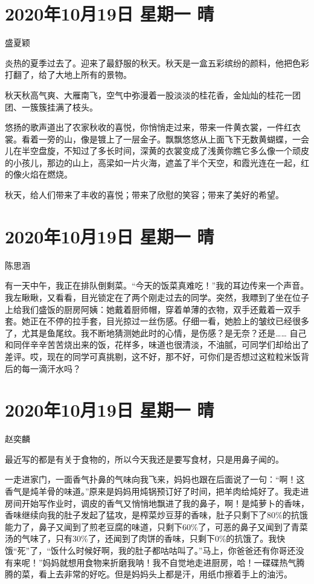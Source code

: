 \section{2020年10月19日 星期一 晴}

盛夏颖

炎热的夏季过去了。迎来了最舒服的秋天。秋天是一盒五彩缤纷的颜料，他把色彩打翻了，给了大地上所有的景物。

秋天秋高气爽、大雁南飞，空气中弥漫着一股淡淡的桂花香，金灿灿的桂花一团团、一簇簇挂满了枝头。

悠扬的歌声道出了农家秋收的喜悦，你悄悄走过来，带来一件黄衣裳，一件红衣裳。看着一旁的山，像是镀上了一层金子。飘飘悠悠从上面飞下无数黄蝴蝶，一会儿在半空盘旋，不知过了多长时间，深黄的衣裳变成了浅黄你瞧它多么像一个顽皮的小孩儿，那边的山上，高梁如一片火海，遮盖了半个天空，和霞光连在一起，红的像火焰在燃烧。

秋天，给人们带来了丰收的喜悦；带来了欣慰的笑容；带来了美好的希望。

\section{2020年10月19日 星期一 晴}

陈思涵

有一天中午，我正在排队倒剩菜。“今天的饭菜真难吃！”我的耳边传来一个声音。我左瞅瞅，又看看，目光锁定在了两个刚走过去的同学。突然，我瞟到了坐在位子上给我们盛饭的厨房阿姨：她戴着厨师帽，穿着单薄的衣物，双手还戴着一双手套。她正在不停的拉手套，目光掠过一丝伤感。仔细一看，她脸上的皱纹已经很多了，尤其是鱼尾纹。我不断地猜测她此时的心情，是伤感？是无奈？还是…… 自己和同伴辛辛苦苦烧出来的饭，花样多，味道也很清淡，不油腻，可同学们却给出了差评。哎，现在的同学可真挑剔，这不好，那不好，可你们是否想过这粒粒米饭背后的每一滴汗水吗？

\section{2020年10月19日 星期一 晴}

赵奕麟

最近写的都是有关于食物的，所以今天我还是要写食材，只是用鼻子闻的。

一走进家门，一面香气扑鼻的气味向我飞来，妈妈也跟在后面说了一句：“啊！这香气是炖羊骨的味道。”原来是妈妈用炖锅预订好了时间，把羊肉给炖好了。我走进房间开始写作业时，调皮的香气又悄悄地飘进了我的鼻子，啊！是炖萝卜的香味，香味继续向我的肚子发起了猛攻，是榨菜炒豆芽的香味，肚子只剩下了80\%的抗饿能力了，鼻子又闻到了煎老豆腐的味道，只剩下60\%了，可恶的鼻子又闻到了青菜汤的气味了，只有30\%了，还闻到了肉饼的香味，只剩下0\%的抗饿了。我快饿“死”了，“饭什么时候好啊，我的肚子都咕咕叫了。”马上，你爸爸还有你哥还没有来呢！”妈妈就想用食物来折磨我呐！我不自觉地走进厨房，哈！一碟碟热气腾腾的菜，看上去非常的好吃。但是妈妈头上都是汗，用纸巾擦着手上的油污。

